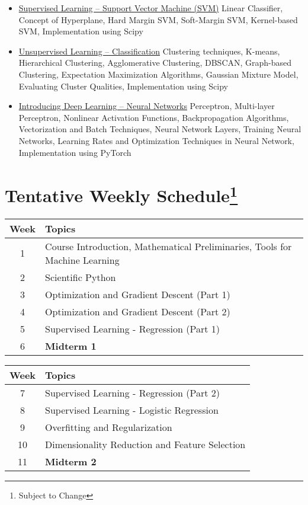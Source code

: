 \documentclass[12pt,nohyper,nobib,xcolor=dvipsnames,svgnames,x11names]{tufte-book}
\begin{document}
{\begin{itemize}
    \item   \color{OrchardRed}  \underline{Supervised Learning -- Support Vector Machine (SVM)} Linear Classifier, Concept of Hyperplane, Hard Margin SVM, Soft-Margin SVM, Kernel-based SVM, Implementation using Scipy
      
   

     \item  \color{OrchardRed} \underline{Unsupervised Learning -- Classification} Clustering techniques, K-means, Hierarchical Clustering, Agglomerative Clustering, DBSCAN, Graph-based Clustering, Expectation Maximization Algorithms, Gaussian Mixture Model, Evaluating Cluster Qualities, Implementation using Scipy

      \item  \color{OrchardRed} \underline{Introducing Deep Learning -- Neural Networks} Perceptron, Multi-layer Perceptron, Nonlinear Activation Functions, Backpropagation Algorithms, Vectorization and Batch Techniques, Neural Network Layers, Training Neural Networks, Learning Rates and Optimization Techniques in Neural Network, Implementation using PyTorch
    
   
\end{itemize}
}


\section*{Tentative Weekly Schedule\footnote{Subject to Change}}

\begin{table}[htbp]
\centering
\begin{tabular}{|c|p{14cm}|}
\hline
Week & Topics \\
\hline
1 & Course Introduction, Mathematical Preliminaries, Tools for Machine Learning \\
\hline
2 & Scientific Python \\
\hline
3 & Optimization and Gradient Descent (Part 1) \\
\hline
4 & Optimization and Gradient Descent (Part 2) \\
\hline
5 & Supervised Learning - Regression (Part 1) \\
\hline
6 & \textbf{Midterm 1} \\
\hline
\end{tabular}
\label{tab:course_schedule_1}
\end{table}

\begin{table}[htbp]
\centering
\begin{tabular}{|c|p{14cm}|}
\hline
Week & Topics \\
\hline
7 & Supervised Learning - Regression (Part 2) \\
\hline
8 & Supervised Learning - Logistic Regression \\
\hline
9 & Overfitting and Regularization \\
\hline
10 & Dimensionality Reduction and Feature Selection \\
\hline
11 & \textbf{Midterm 2} \\
\hline
\end{tabular}
\label{tab:course_schedule_2}
\end{table}
\end{document}
